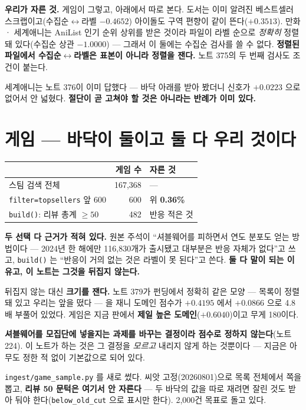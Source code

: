 \documentclass[11pt]{article}
\begin{document}
\textbf{우리가 자른 것.} 게임이 그렇고, 아래에서 따로 본다. 도서는 이미
알려진 베스트셀러 스크랩이고(수집순$\leftrightarrow$라벨 $-0.4652$) 아이돌도
구역 편향이 같이 뜬다($+0.3513$). 만화 · 세계애니는 AniList 인기 순위
상위를 받은 것이라 파일이 라벨 순으로 \emph{정확히} 정렬돼 있다(수집순
상관 $-1.0000$) --- 그래서 이 둘에는 수집순 검사를 쓸 수 없다.
\textbf{정렬된 파일에서 수집순$\leftrightarrow$라벨은 표본이 아니라 정렬을
잰다.} 노트 375의 두 번째 검사도 조건이 붙는다.

세계애니는 노트 376이 이미 답했다 --- 바닥 아래를 받아 봤더니 신호가
$+0.0223$ 으로 없어서 안 넓혔다. \textbf{절단이 곧 고쳐야 할 것은
아니라는 반례가 이미 있다.}

\section{게임 --- 바닥이 둘이고 둘 다 우리 것이다}

\begin{center}
\begin{tabular}{lrl}
\hline
 & 게임 수 & 자른 것 \\
\hline
스팀 검색 전체 & 167,368 & --- \\
\texttt{filter=topsellers} 앞 600 & 600 & 위 \textbf{0.36\%} \\
\texttt{build()}: 리뷰 총계 $\ge 50$ & 482 & 반응 적은 것 \\
\hline
\end{tabular}
\end{center}

\textbf{두 선택 다 근거가 적혀 있다.} 원본 주석이 ``셔블웨어를 피하면서
연도 분포도 얻는 방법이다 --- 2024년 한 해에만 116,830개가 출시됐고
대부분은 반응 자체가 없다''고 쓰고, \texttt{build()} 는 ``반응이 거의
없는 것은 라벨이 못 된다''고 쓴다. \textbf{둘 다 말이 되는 이유고, 이
노트는 그것을 뒤집지 않는다.}

뒤집지 않는 대신 \textbf{크기를 잰다.} 노트 379가 펀딩에서 정확히 같은
모양 --- 목록이 정렬돼 있고 우리는 앞을 떴다 --- 을 재니 도메인 점수가
$+0.4195$ 에서 $+0.0866$ 으로 4.8배 부풀어 있었다. 게임은 지금 판에서
\textbf{제일 높은 도메인}($+0.6040$)이고 무게 180이다.

\textbf{셔블웨어를 모집단에 넣을지는 과제를 바꾸는 결정이라 점수로 정하지
않는다}(노트 224). 이 노트가 하는 것은 그 결정을 \emph{모르고} 내리지
않게 하는 것뿐이다 --- 지금은 아무도 정한 적 없이 기본값으로 되어 있다.

\texttt{ingest/game\_sample.py} 를 새로 썼다. 씨앗 고정(20260801)으로
목록 전체에서 쪽을 뽑고, \textbf{리뷰 50 문턱은 여기서 안 자른다} ---
두 바닥의 값을 따로 재려면 잘린 것도 받아 둬야 한다(\texttt{below\_old\_cut}
으로 표시만 한다). 2,000건 목표로 돌고 있다.
\end{document}
